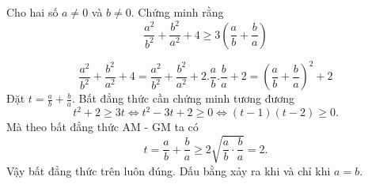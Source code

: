 \begin{problem}
	Cho hai số $a \neq 0$ và $b \neq 0$. Chứng minh rằng
	\[
		\frac{a^2}{b^2} + \frac{b^2}{a^2} + 4 \ge 3\left(\frac{a}{b} + \frac{b}{a}\right)
	\]
	\solution

	\[
		\frac{a^2}{b^2} + \frac{b^2}{a^2} + 4 = \frac{a^2}{b^2} + \frac{b^2}{a^2} + 2.\frac{a}{b}.\frac{b}{a} + 2 = \left(\frac{a}{b} + \frac{b}{a}\right)^2 + 2	
	\]	
	Đặt $\displaystyle t = \frac{a}{b} + \frac{b}{a}$. Bất đẳng thức cần chứng minh tương đương
	\[
		t^2 + 2 \ge 3t \Leftrightarrow t^2 - 3t + 2 \ge 0 \Leftrightarrow (t - 1)(t - 2) \ge 0.
	\]
	Mà theo bất đẳng thức AM - GM ta có
	\[
		t = \frac{a}{b} + \frac{b}{a} \ge 2\sqrt{\frac{a}{b}\cdot\frac{b}{a}} = 2.
	\]
	Vậy bất đẳng thức trên luôn đúng. Dấu bằng xảy ra khi và chỉ khi $a = b$.
	
\end{problem}